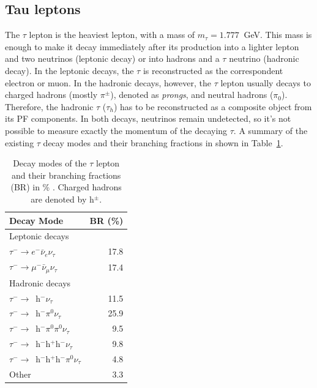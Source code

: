 \documentclass[../main.tex]{subfiles}
\begin{document}
\subsection{Tau leptons}
\label{intro:subsec:taus}

The $\tau$ lepton is the heaviest lepton, with a mass of $m_\tau = 1.777~$ GeV. This mass is enough to make it decay immediately after its production into a lighter lepton and two neutrinos (leptonic decay) or into hadrons and a $\tau$ neutrino (hadronic decay). In the leptonic decays, the $\tau$ is reconstructed as the correspondent electron or muon. In the hadronic decays, however, the $\tau$ lepton usually decays to charged hadrons (mostly $\pi^\pm$), denoted as \textit{prongs}, and neutral hadrons ($\pi_0$). Therefore, the hadronic $\tau$ ($\tau_h$) has to be reconstructed as a composite object from its PF components. In both decays, neutrinos remain undetected, so it's not possible to measure exactly the momentum of the decaying $\tau$. A summary of the existing $\tau$ decay modes and their branching fractions in shown in Table~\ref{id:tab:tau_decay}.


\begin{table}
\begin{center}
\begin{tabular}{l  r}
Decay Mode & BR (\%)\\\hline\hline
Leptonic decays \\
$\tau^- \to e^-\bar{\nu}_e\nu_\tau$ & 17.8 \\
$\tau^- \to \mu^-\bar{\nu}_\mu\nu_\tau$ & 17.4 \\\hline
Hadronic decays \\
$\tau^- \to$~h${}^-\nu_\tau$ & 11.5 \\
$\tau^- \to$~h${}^-\pi^0\nu_\tau$ & 25.9 \\
$\tau^- \to$~h${}^-\pi^0\pi^0\nu_\tau$ & 9.5 \\
$\tau^- \to$~h${}^-$h${}^+$h${}^-\nu_\tau$ & 9.8 \\
$\tau^- \to$~h${}^-$h${}^+$h${}^-\pi^0\nu_\tau$ & 4.8 \\
Other & 3.3
\end{tabular}
\end{center}
\caption{Decay modes of the $\tau$ lepton and their branching fractions (BR) in \% \cite{pdg}. Charged hadrons are denoted by h${}^\pm$.}
\label{id:tab:tau_decay}
\end{table}
\end{document}
